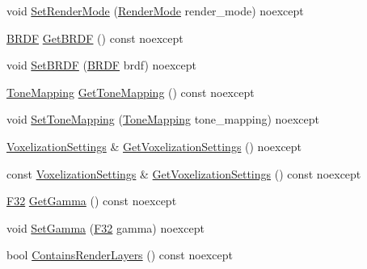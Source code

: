 \begin{DoxyCompactItemize}
\item 
void \mbox{\hyperlink{classmage_1_1rendering_1_1_camera_settings_aa4f29b081141c0acfb0e4d92eac81602}{Set\+Render\+Mode}} (\mbox{\hyperlink{namespacemage_1_1rendering_aeb14ce7610cc9391f4e01be027b91dcc}{Render\+Mode}} render\+\_\+mode) noexcept
\item 
\mbox{\hyperlink{namespacemage_1_1rendering_ab8fe8684ca4bd74ba3a394b00cf125b5}{B\+R\+DF}} \mbox{\hyperlink{classmage_1_1rendering_1_1_camera_settings_a3cb398b3bd69ae3a81e2e4c415d9e195}{Get\+B\+R\+DF}} () const noexcept
\item 
void \mbox{\hyperlink{classmage_1_1rendering_1_1_camera_settings_af2af3e55e876b0e2b037904e221f0bc4}{Set\+B\+R\+DF}} (\mbox{\hyperlink{namespacemage_1_1rendering_ab8fe8684ca4bd74ba3a394b00cf125b5}{B\+R\+DF}} brdf) noexcept
\item 
\mbox{\hyperlink{namespacemage_1_1rendering_a789e4b7d9a8cc831b065e9c6bb7430e9}{Tone\+Mapping}} \mbox{\hyperlink{classmage_1_1rendering_1_1_camera_settings_ae127ec7aa6c836b747d947200f847254}{Get\+Tone\+Mapping}} () const noexcept
\item 
void \mbox{\hyperlink{classmage_1_1rendering_1_1_camera_settings_ab5dc52d8f8d92cf3c4f6aca126f6dc47}{Set\+Tone\+Mapping}} (\mbox{\hyperlink{namespacemage_1_1rendering_a789e4b7d9a8cc831b065e9c6bb7430e9}{Tone\+Mapping}} tone\+\_\+mapping) noexcept
\item 
\mbox{\hyperlink{classmage_1_1rendering_1_1_voxelization_settings}{Voxelization\+Settings}} \& \mbox{\hyperlink{classmage_1_1rendering_1_1_camera_settings_ae30e0070a7376d99a9e3db5c24e45341}{Get\+Voxelization\+Settings}} () noexcept
\item 
const \mbox{\hyperlink{classmage_1_1rendering_1_1_voxelization_settings}{Voxelization\+Settings}} \& \mbox{\hyperlink{classmage_1_1rendering_1_1_camera_settings_a2e3906063aa11044dc325affee24aeb1}{Get\+Voxelization\+Settings}} () const noexcept
\item 
\mbox{\hyperlink{namespacemage_aa97e833b45f06d60a0a9c4fc22ae02c0}{F32}} \mbox{\hyperlink{classmage_1_1rendering_1_1_camera_settings_ae99d9db32dcf8be886e324b647d90ade}{Get\+Gamma}} () const noexcept
\item 
void \mbox{\hyperlink{classmage_1_1rendering_1_1_camera_settings_aff3d5727eaff77fd9f8bb30d352ff7d7}{Set\+Gamma}} (\mbox{\hyperlink{namespacemage_aa97e833b45f06d60a0a9c4fc22ae02c0}{F32}} gamma) noexcept
\item 
bool \mbox{\hyperlink{classmage_1_1rendering_1_1_camera_settings_aa6a33e3b5936e440af32d2ca3d65585f}{Contains\+Render\+Layers}} () const noexcept

\end{DoxyCompactItemize}
